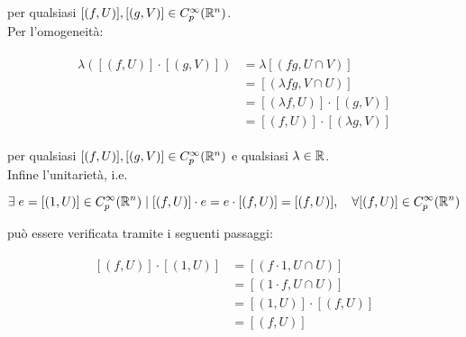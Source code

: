 {per qualsiasi $ [(f,U)], [(g,V)] \in C_{p}^{\infty}(\mathbb{R}^{n}) $. \\
Per l'omogeneità:

\begin{align}
	\begin{split}
		\lambda ([(f,U)] \cdot [(g,V)]) &= \lambda [(fg,U \cap V)] \\
		&= [(\lambda fg,V \cap U)] \\
		&= [(\lambda f,U)] \cdot [(g,V)] \\
		&= [(f,U)] \cdot [(\lambda g,V)]
	\end{split}
\end{align}

per qualsiasi $ [(f,U)], [(g,V)] \in C_{p}^{\infty}(\mathbb{R}^{n}) $ e qualsiasi $ \lambda \in \mathbb{R} $. \\
Infine l'unitarietà, i.e.

\begin{equation}
	\E e = [(1,U)] \in C_{p}^{\infty}(\R^{n}) \mid [(f,U)] \cdot e = e \cdot [(f,U)] = [(f,U)] %
	\qcomma \forall [(f,U)] \in C_{p}^{\infty}(\R^{n})
\end{equation}

può essere verificata tramite i seguenti passaggi:

\begin{align}
	\begin{split}
		[(f,U)] \cdot [(1,U)] &= [(f \cdot 1,U \cap U)] \\
		&= [(1 \cdot f,U \cap U)] \\
		&= [(1,U)] \cdot [(f,U)] \\
		&= [(f,U)]
	\end{split}
\end{align}
}



